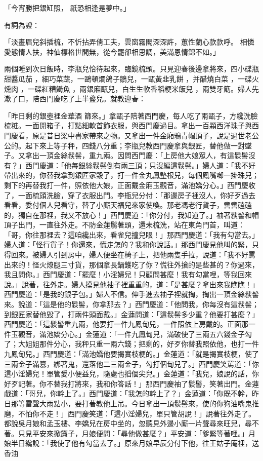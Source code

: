 \begin{showcontents}{}
「今宵勝把銀缸照，  祇恐相逢是夢中。」

有詞為證：

「淡畫眉兒斜插梳，不忻拈弄倩工夫，雲窗霧閣深深許，蕙性蘭心款款呼。  相憐愛態情人扶，神仙標格世間無，從今罷卻相思調，美滿恩情錦不如。」

兩個睡到次日飯時，李瓶兒恰待起來，臨鏡梳頭。只見迎春後邊拿將來，四小碟瓶甜醬瓜茄 ，細巧菜蔬，一鷗頓爛鴿子鶵兒，一甌黃韭乳餅 ，并醋燒白菜 ，一碟火燻肉 ，一碟紅糟鰣魚 ，兩銀廂甌兒，白生生軟香稻粳米飯兒 ，兩雙牙筯。婦人先漱了口，陪西門慶吃了上半盞兒。就教迎春：

「昨日剩的銀壺裡金華酒 篩來。」拿甌子陪著西門慶，每人吃了兩甌子，方纔洗臉梳粧。一面開箱子，打點細軟首飾衣服，與西門慶過目。拿出一百顆西洋珠子與西門慶看，原是昔日梁中書家帶來之物。又拿出一件金廂鴉青帽頂子，說是過世老公公的。起下來上等子秤，四錢八分重；李瓶兒教西門慶拿與銀匠，替他做一對墜子。又拿出一頂金絲䯼髻，重九兩。因問西門慶：「上房他大娘眾人，有這䯼髻沒有？」西門慶道：「他每銀絲䯼髻倒有兩三頂；只沒編這䯼髻。」婦人道：「我不好帶出來的，你替我拿到銀匠家毀了，打一件金丸鳳墊根兒，每個鳳嘴啣一掛珠兒；剩下的再替我打一件，照依他大娘，正面戴金廂玉觀音，滿池嬌分心。」西門慶收了，一面梳頭洗臉，穿了衣服出門。李瓶兒分付：「那邊房子裡沒人，你好歹過去看看，委付個人兒看守，替了小廝天福兒來家使喚。那老馮老行貨子，啻啻磕磕的，獨自在那裡，我又不放心！」西門慶道：「你分付，我知道了。」袖著䯼髻和帽頂子出門，一直往外走。不防金蓮鬅著頭，還未梳洗，站在東角門首，叫道：「哥，你往那裡去？這咱纔出來，看雀兒撞兒眼！」那西門慶道：「我有勾當去。」婦人道：「怪行貨子！你還來，慌走怎的？我和你說話。」那西門慶見他叫的緊，只得回來。被婦人引到房中，婦人便坐在椅子上，把他兩隻手拉，說道：「我不好罵出來的！怪火燎腿三寸貨，那個拿長鍋鑊吃了你？慌往外搶的是些甚的？你過來，我且問你。」西門慶道：「罷麼！小淫婦兒！只顧問甚麼！我有勾當哩，等我回來說。」說著，往外走。婦人摸見他袖子裡重重的，道：「是甚麼？拿出來我瞧瞧！」西門慶道：「是我的銀子包。」婦人不信。伸手進去袖子裡就掏，掏出一頂金絲䯼髻來。說道：「這是他的䯼髻，你拿那去？」西門慶道：「他問我，你每沒有這䯼髻；到銀匠家替他毀了，打兩件頭面戴。」金蓮問道：「這䯼髻多少重？他要打甚麼？」西門慶道：「這䯼髻重九兩，他要打一件九鳳甸兒，一件照依上房戴的。正面那一件玉觀音，滿池嬌分心。」金蓮道：「一件九鳳甸兒，滿破使了三兩五六錢金子勾了；大姐姐那件分心，我秤只重一兩六錢；把剩的，好歹你替我照依他，也打一件九鳳甸兒。」西門慶道：「滿池嬌他要揭實枝梗的。」金蓮道：「就是揭實枝梗，使了三兩金子滿篡，綁著鬼，還落他二三兩金子，勾打個甸兒了。」西門慶笑罵道：「你這小淫婦兒！單管愛小便益兒，隨處也搯個尖兒。」金蓮道：「我兒，娘說的話，你好歹記著。你不替我打將來，我和你答話！」那西門慶袖了䯼髻，笑著出門。金蓮戲道：「哥兒，你幹上了。」西門慶道：「我怎的幹上了？」金蓮道：「你既不幹，昨日那等雷聲大雨點小，要打著教他上吊。今日拿出一頂䯼髻來，使的你狗油嘴鬼推磨，不怕你不走！」西門慶笑道：「這小淫婦兒，單只管胡說！」說著往外走了。都說吳月娘和孟玉樓、李嬌兒在房中坐的，忽聽見外邊小廝一片聲尋來旺兒，尋不著。只見平安來掀簾子，月娘便問：「尋他做甚麼？」平安道：「爹緊等著哩。」月娘半日纔說：「我使了他有勾當去了。」原來月娘早辰分付下他，往王姑子庵裡，送香油 
\end{showcontents}
